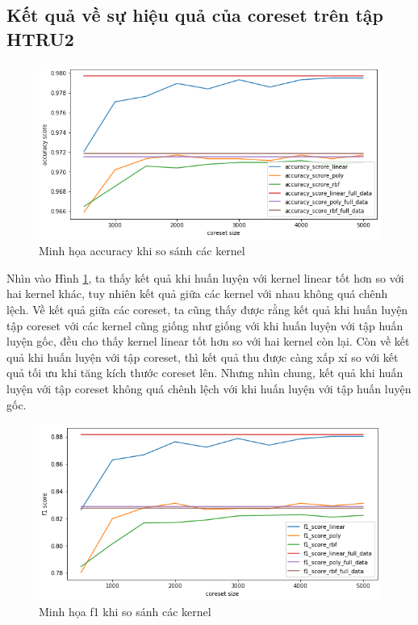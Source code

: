 \documentclass[a4paper, 12pt, oneside]{report}
\begin{document}
\subsection{Kết quả về sự hiệu quả của coreset trên tập HTRU2}
\begin{center}
    \begin{figure}[H]
    \begin{center}
     \includegraphics[scale=0.4]{HTRU2_4.png}
    \end{center}
    \caption{Minh họa accuracy khi so sánh các kernel}
    \label{Hình 4.14}
    \end{figure}
\end{center}
Nhìn vào Hình \ref{Hình 4.14}, ta thấy kết quả khi huấn luyện với kernel linear tốt hơn so với hai kernel khác, tuy nhiên kết quả giữa các kernel với nhau không quá chênh lệch. Về kết quả giữa các coreset, ta cũng thấy được rằng kết quả khi huấn luyện tập coreset với các kernel cũng giống như giống với khi huấn luyện với tập huấn luyện gốc, đều cho thấy kernel linear tốt hơn so với hai kernel còn lại. Còn về kết quả khi huấn luyện với tập coreset, thì kết quả thu được càng xấp xỉ so với kết quả tối ưu khi tăng kích thước coreset lên. Nhưng nhìn chung, kết quả khi huấn luyện với tập coreset không quá chênh lệch với khi huấn luyện với tập huấn luyện gốc. 
\begin{center}
    \begin{figure}[H]
    \begin{center}
     \includegraphics[scale=0.4]{HTRU2_5.png}
    \end{center}
    \caption{Minh họa f1 khi so sánh các kernel}
    \label{Hình 4.15}
    \end{figure}
\end{center}
\end{document}
